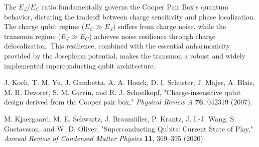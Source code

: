 \documentclass[12pt]{article}
\begin{document}
The $E_J/E_C$ ratio fundamentally governs the Cooper Pair Box's quantum behavior, dictating the tradeoff between charge sensitivity and phase localization. The charge qubit regime ($E_C \gg E_J$) suffers from charge noise, while the transmon regime ($E_J \gg E_C$) achieves noise resilience through charge delocalization. This resilience, combined with the essential anharmonicity provided by the Josephson potential, makes the transmon a robust and widely implemented superconducting qubit architecture.

\begin{thebibliography}{9}
    J. Koch, T. M. Yu, J. Gambetta, A. A. Houck, D. I. Schuster, J. Majer, A. Blais, M. H. Devoret, S. M. Girvin, and R. J. Schoelkopf, 
    "Charge-insensitive qubit design derived from the Cooper pair box," 
    \textit{Physical Review A} \textbf{76}, 042319 (2007).

    M. Kjaergaard, M. E. Schwartz, J. Braumüller, P. Krantz, J. I.-J. Wang, S. Gustavsson, and W. D. Oliver, 
    "Superconducting Qubits: Current State of Play," 
    \textit{Annual Review of Condensed Matter Physics} \textbf{11}, 369–395 (2020).
\end{thebibliography}
\end{document}
